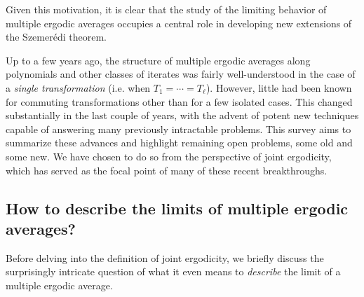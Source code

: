 \documentclass[11pt]{amsart}
\theoremstyle{definition}
\newcommand{\1}{{\mathbf{1}}}
\begin{document}
Given this motivation, it is clear that the study of the limiting behavior of multiple ergodic averages occupies a central role in developing new extensions of the Szemer\'edi theorem.  

Up to a few years ago, the structure of multiple ergodic averages along polynomials and other classes of iterates
was fairly well-understood in the case of a \emph{single transformation} (i.e. when $T_1 = \cdots = T_\ell$). However, little had been known for commuting transformations other than for a few isolated cases. This changed substantially in the last couple of years, with the advent of potent new techniques capable of answering many previously intractable problems.
This survey aims to summarize these advances and highlight remaining open problems, some old and some new. We have chosen to do so from the perspective of joint ergodicity, which has served as the focal point of many of these recent breakthroughs. 

\subsection{How to describe the limits of multiple ergodic averages?}

Before delving into the definition of joint ergodicity, we briefly discuss the surprisingly intricate question of what it even means to \emph{describe} the limit of a multiple ergodic average. 
\end{document}

